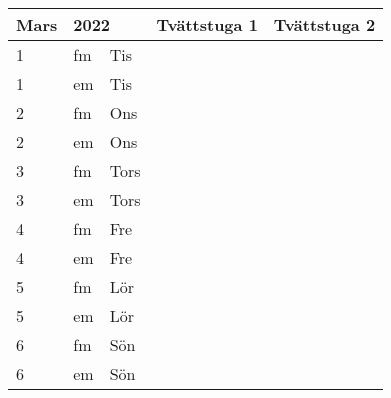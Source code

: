 \documentclass[a4paper]{article}
\begin{document}
\begin{table}[ht!]
\vspace{-10em}%
\normalsize
\begin{tabular}{lllp{7cm}p{7cm}}
\textbf{Mars}           & \multicolumn{2}{l}{\textbf{2022}}                  & \textbf{Tvättstuga 1} & \textbf{Tvättstuga 2} \\ \hline    

\multicolumn{1}{|l|}{1} & \multicolumn{1}{l|}{fm} & \multicolumn{1}{l|}{Tis} & \multicolumn{1}{l|}{} & \multicolumn{1}{l|}{} \\ \hline
\multicolumn{1}{|l|}{1} & \multicolumn{1}{l|}{em} & \multicolumn{1}{l|}{Tis} & \multicolumn{1}{l|}{} & \multicolumn{1}{l|}{} \\ \hline    

\multicolumn{1}{|l|}{2} & \multicolumn{1}{l|}{fm} & \multicolumn{1}{l|}{Ons} & \multicolumn{1}{l|}{} & \multicolumn{1}{l|}{} \\ \hline
\multicolumn{1}{|l|}{2} & \multicolumn{1}{l|}{em} & \multicolumn{1}{l|}{Ons} & \multicolumn{1}{l|}{} & \multicolumn{1}{l|}{} \\ \hline    

\multicolumn{1}{|l|}{3} & \multicolumn{1}{l|}{fm} & \multicolumn{1}{l|}{Tors} & \multicolumn{1}{l|}{} & \multicolumn{1}{l|}{} \\ \hline
\multicolumn{1}{|l|}{3} & \multicolumn{1}{l|}{em} & \multicolumn{1}{l|}{Tors} & \multicolumn{1}{l|}{} & \multicolumn{1}{l|}{} \\ \hline    

\multicolumn{1}{|l|}{4} & \multicolumn{1}{l|}{fm} & \multicolumn{1}{l|}{Fre} & \multicolumn{1}{l|}{} & \multicolumn{1}{l|}{} \\ \hline
\multicolumn{1}{|l|}{4} & \multicolumn{1}{l|}{em} & \multicolumn{1}{l|}{Fre} & \multicolumn{1}{l|}{} & \multicolumn{1}{l|}{} \\ \hline    

\multicolumn{1}{|l|}{5} & \multicolumn{1}{l|}{fm} & \multicolumn{1}{l|}{Lör} & \multicolumn{1}{l|}{} & \multicolumn{1}{l|}{} \\ \hline
\multicolumn{1}{|l|}{5} & \multicolumn{1}{l|}{em} & \multicolumn{1}{l|}{Lör} & \multicolumn{1}{l|}{} & \multicolumn{1}{l|}{} \\ \hline    

\multicolumn{1}{|l|}{6} & \multicolumn{1}{l|}{fm} & \multicolumn{1}{l|}{Sön} & \multicolumn{1}{l|}{} & \multicolumn{1}{l|}{} \\ \hline
\multicolumn{1}{|l|}{6} & \multicolumn{1}{l|}{em} & \multicolumn{1}{l|}{Sön} & \multicolumn{1}{l|}{} & \multicolumn{1}{l|}{} \\ \hline    


\end{tabular}
\end{table}
\end{document}

